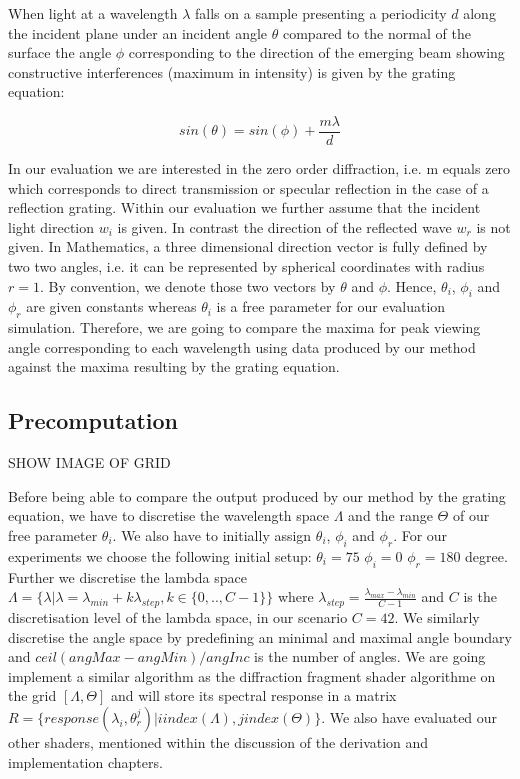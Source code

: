 When light at a wavelength $\lambda$ falls on a sample presenting a periodicity $d$ along the incident plane under an incident angle $\theta$ compared to the normal of the surface the angle $\phi$ corresponding to the direction of the emerging beam showing constructive interferences (maximum in intensity) is given by the grating equation:

\begin{equation}
  sin(\theta) = sin(\phi) + \frac{m \lambda}{d}
\end{equation}

In our evaluation we are interested in the zero order diffraction, i.e. m equals zero which corresponds to direct transmission or specular reflection in the case of a reflection grating. 
Within our evaluation we further assume that the incident light direction $w_i$ is given. In contrast the direction of the reflected wave $w_r$ is not given.
In Mathematics, a three dimensional direction vector is fully defined by two two angles, i.e. it can be represented by spherical coordinates with radius $r = 1$. By convention, we denote those two vectors by $\theta$ and $\phi$. Hence, $\theta_i$, $\phi_i$ and $\phi_r$ are given constants whereas $\theta_i$ is a free parameter for our evaluation simulation. Therefore, we are going to compare the maxima for peak viewing angle corresponding to each wavelength using data produced by our method against the maxima resulting by the grating equation.

\subsection{Precomputation}
SHOW IMAGE OF GRID

Before being able to compare the output produced by our method by the grating equation, we have to discretise the wavelength space $\Lambda$ and the range $\Theta$ of our free parameter $\theta_i$. We also have to initially assign  $\theta_i$, $\phi_i$ and $\phi_r$. For our experiments we choose the following initial setup: $\theta_i = 75$ $\phi_i = 0$ $\phi_r = 180$ degree.
Further we discretise the lambda space $\Lambda = \{\lambda | \lambda = \lambda_{min} + k\lambda_{step}, k \in \{0,..,C-1\}\}$ where $\lambda_{step} = \frac{\lambda_{max}-\lambda_{min}}{C-1}$ and $C$ is the discretisation level of the lambda space, in our scenario $C = 42$. We similarly discretise the angle space by predefining an minimal and maximal angle boundary and $ceil(angMax - angMin) / angInc$ is the number of angles. 
We are going implement a similar algorithm as the diffraction fragment shader algorithme on the grid $[\Lambda, \Theta]$ and will store its spectral response in a matrix $R = \{response(\lambda_i, \theta_{r}^{j}) | i index(\Lambda), j index(\Theta)\}$. We also have evaluated our other shaders, mentioned within the discussion of the derivation and implementation chapters.

